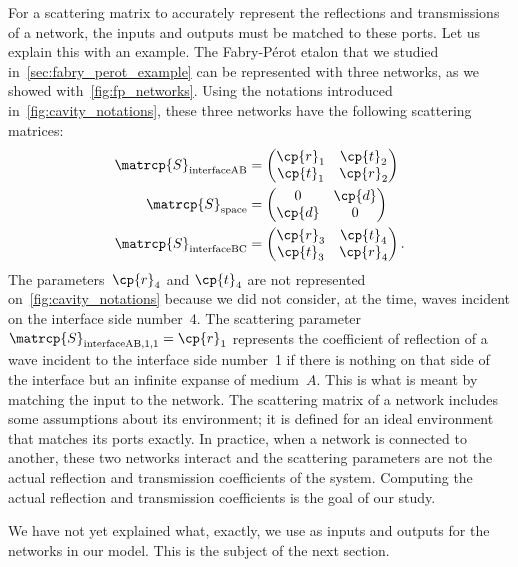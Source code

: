 For a scattering matrix to accurately represent the reflections and transmissions of a network, the inputs and outputs must be matched to these ports.
Let us explain this with an example.
The Fabry-Pérot etalon that we studied in~\cref{sec:fabry_perot_example} can be represented with three networks, as we showed with~\cref{fig:fp_networks}.
Using the notations introduced in~\vref{fig:cavity_notations},
these three networks have the following scattering matrices:
\begin{align}
    \matrcp{S}_\text{interfaceAB}
    &=
    \begin{pmatrix}
        \cp{r}_1 & \cp{t}_2 \\
        \cp{t}_1 & \cp{r}_2
    \end{pmatrix}
    \\
    \matrcp{S}_\text{space}
    &=
    \begin{pmatrix}
        0      & \cp{d} \\
        \cp{d} & 0
    \end{pmatrix}
    \\
    \matrcp{S}_\text{interfaceBC}
    &=
    \begin{pmatrix}
        \cp{r}_3 & \cp{t}_4 \\
        \cp{t}_3 & \cp{r}_4
    \end{pmatrix}
    \text{.}
\end{align}
The parameters~$\cp{r}_4$ and $\cp{t}_4$ are not represented on~\cref{fig:cavity_notations}
because we did not consider, at the time, waves incident on the interface side number~4.
The scattering parameter $\matrcp{S}_\text{interfaceAB,1,1} = \cp{r}_1$ represents the coefficient of reflection of a wave incident to the interface side number~1 if there is nothing on that side of the interface but an infinite expanse of medium~$A$.
This is what is meant by matching the input to the network.
The scattering matrix of a network includes some assumptions about its environment;
it is defined for an ideal environment that matches its ports exactly.
In practice, when a network is connected to another, these two networks interact and the scattering parameters are not the actual reflection and transmission coefficients of the system.
Computing the actual reflection and transmission coefficients is the goal of our study.

We have not yet explained what, exactly, we use as inputs and outputs for the networks in our model.
This is the subject of the next section.




